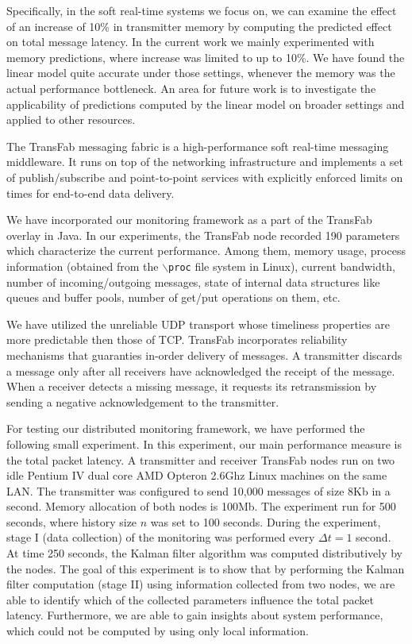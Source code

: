 \documentclass[times, 10pt,twocolumn]{article}
\begin{document}
Specifically, in the soft real-time systems we focus on, we can examine the effect of an increase of 10\% in transmitter memory by computing the predicted effect on total message latency. In the current work we
mainly experimented with memory predictions, where increase was limited to up to 10\%. We have found the linear
model quite accurate under those settings, whenever the memory was the actual performance bottleneck. An area for future work is to investigate the applicability of predictions computed by the linear model on broader settings and applied to other resources.

\label{sec:exp}
The TransFab messaging fabric is a high-performance soft real-time messaging middleware.
It runs on top of the networking infrastructure and implements a set of publish/subscribe and point-to-point services
with explicitly enforced limits on times for end-to-end data delivery. 

We have incorporated our monitoring framework as a part of the TransFab overlay in Java.
In our experiments, the TransFab node recorded 190 parameters which characterize the current performance. Among them, memory usage, process information (obtained from the {\tt $\backslash$proc} file system in Linux), current bandwidth, number of incoming/outgoing messages, state of internal data structures like queues and buffer pools, number of get/put operations on them, etc.

We have utilized the unreliable UDP transport whose timeliness properties are more predictable then those of TCP. TransFab incorporates reliability mechanisms that guaranties in-order delivery of messages.
A transmitter discards a message only after all receivers have acknowledged the receipt of the message. When a receiver detects a missing message, it requests its retransmission by sending a negative acknowledgement to the transmitter.

For testing our distributed monitoring framework, we have performed the following small experiment.
In this experiment, our main performance measure is the total packet latency.
A transmitter and receiver TransFab nodes run on two idle Pentium IV dual core AMD Opteron 2.6Ghz Linux machines on the same LAN. The transmitter was configured to send 10,000 messages of size 8Kb in a second. Memory allocation of both nodes is 100Mb.
The experiment run for 500 seconds, where history size $n$ was set to 100 seconds. During the experiment, stage I (data collection) of the monitoring was performed every $\Delta t = 1$ second. At time 250 seconds, the Kalman filter
algorithm was computed distributively by the nodes. The goal of this
experiment is to show that by performing the Kalman filter computation (stage II) using information collected
from two nodes, we are able to identify which of the collected parameters influence the total packet latency.
Furthermore, we are able to gain insights about system performance, which could not be computed by using only local
information.
\end{document}
